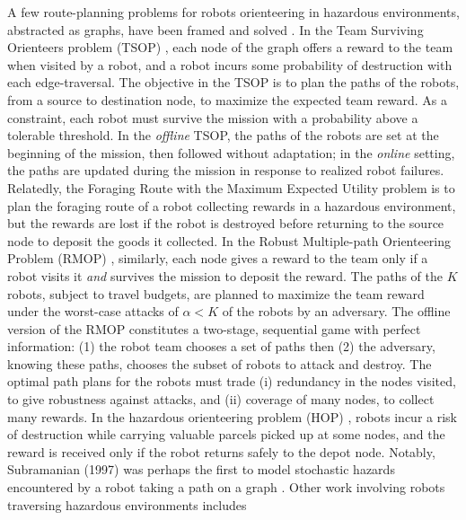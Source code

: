 \documentclass[fleqn,10pt,lineno]{wlpeerj}
\begin{document}
A few route-planning problems for robots orienteering in hazardous environments, abstracted as graphs, have been framed and solved \cite{zhou2021multi}. 
In the Team Surviving Orienteers problem (TSOP) \cite{jorgensen2018team,jorgensen2017matroid,jorgensen2024matroid}, each node of the graph offers a reward to the team when visited by a robot, and a robot incurs some probability of destruction with each edge-traversal.
The objective in the TSOP is to plan the paths of the robots, from a source to destination node, to maximize the expected team reward. As a constraint, each robot must survive the mission with a probability above a tolerable threshold. 
In the \emph{offline} TSOP, the paths of the robots are set at the beginning of the mission, then followed without adaptation; in the \emph{online} setting, the paths are updated during the mission in response to realized robot failures.
Relatedly, the Foraging Route with the Maximum Expected Utility problem \cite{di2022foraging} is to plan the foraging route of a robot collecting rewards in a hazardous environment, but the rewards are lost if the robot is destroyed before returning to the source node to deposit the goods it collected.
In the Robust Multiple-path Orienteering Problem (RMOP) \cite{shi2023robust}, similarly, each node gives a reward to the team only if a robot visits it \emph{and} survives the mission to deposit the reward. The paths of the $K$ robots, subject to travel budgets, are planned to maximize the team reward under the worst-case attacks of $\alpha<K$ of the robots by an adversary. 
The offline version of the RMOP constitutes a two-stage, sequential game with perfect information: (1) the robot team chooses a set of paths then (2) the adversary, knowing these paths, chooses the subset of robots to attack and destroy. 
The optimal path plans for the robots must trade (i) redundancy in the nodes visited, to give robustness against attacks, and (ii) coverage of many nodes, to collect many rewards.
In the hazardous orienteering problem (HOP) \cite{santini2023hazardous,montemanni2025exact}, robots incur a risk of destruction while carrying valuable parcels picked up at some nodes, and the reward is received only if the robot returns safely to the depot node.
Notably, Subramanian (1997) was perhaps the first to model stochastic hazards encountered by a robot taking a path on a graph \cite{sherali1997low}.
Other work involving robots traversing hazardous environments includes 
\end{document}
